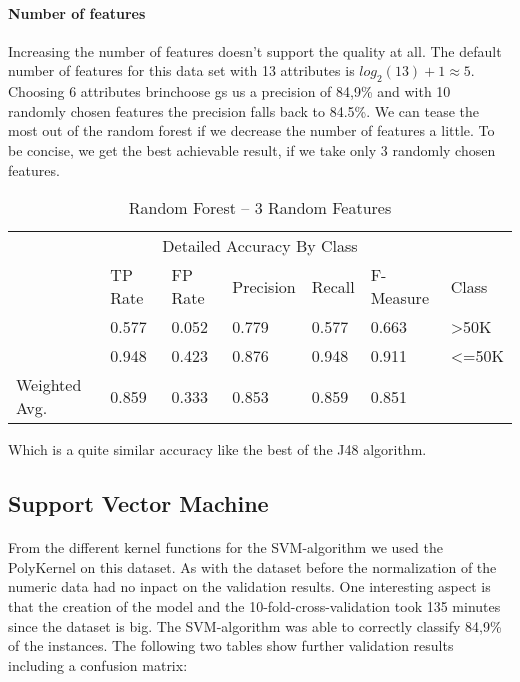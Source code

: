 \documentclass[paper=a4, fontsize=11pt]{scrartcl} %
\numberwithin{equation}{section} %
\numberwithin{figure}{section} %
\numberwithin{table}{section} %
\begin{document}
\paragraph{Number of features}
Increasing the number of features doesn't support the quality at all. The default number of features for this data set with 13 attributes is $ log_2(13) + 1 \approx 5 $. Choosing 6 attributes brinchoose gs us a precision of 84,9\% and with 10 randomly chosen features the precision falls back to 84.5\%. We can tease the most out of the random forest if we decrease the number of features a little. To be concise, we get the best achievable result, if we take only 3 randomly chosen
features.
\begin{table*}[htb]\centering
  \begin{tabular*}{\columnwidth}{@{}lllllll@{}}
      \toprule 
      \multicolumn{7}{c}{Detailed Accuracy By Class} \\ 
               &  TP Rate & FP Rate & Precision & Recall & F-Measure & Class \\   \midrule
               &  0.577   & 0.052   & 0.779     & 0.577  & 0.663     & >50K  \\   
               &  0.948   & 0.423   & 0.876     & 0.948  & 0.911     & <=50K \\   
Weighted Avg.  &  0.859   & 0.333   & 0.853     & 0.859  & 0.851     &       \\   \bottomrule
    \end{tabular*}
\caption{Random Forest -- 3 Random Features} 
\label{tab:adult:rand:3f}
\end{table*}
\FloatBarrier
Which is a quite similar accuracy like the best of the J48 algorithm. 


\subsection{Support Vector Machine}

\paragraph{}From the different kernel functions for the SVM-algorithm we used the PolyKernel on this dataset. As with the dataset before the normalization of the numeric data had no inpact on the validation results. One interesting aspect is that the creation of the model and the 10-fold-cross-validation took 135 minutes since the dataset is big. The SVM-algorithm was able to correctly classify 84,9\% of the instances. The following two tables show further validation results including a confusion matrix:
\end{document}
